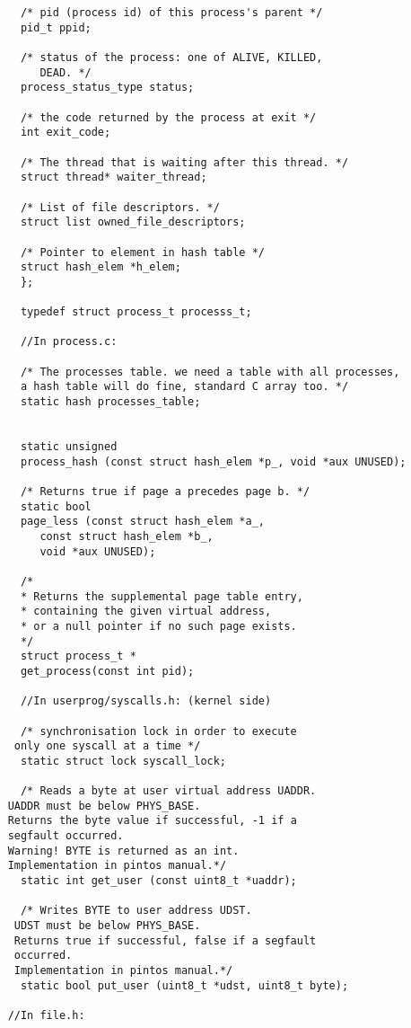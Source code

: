 {\begin{lstlisting}
	  /* pid (process id) of this process's parent */
	  pid_t ppid;				
	  
	  /* status of the process: one of ALIVE, KILLED, 
	     DEAD. */
	  process_status_type status;
      
	  /* the code returned by the process at exit */
	  int exit_code;

	  /* The thread that is waiting after this thread. */
	  struct thread* waiter_thread;

	  /* List of file descriptors. */
	  struct list owned_file_descriptors;

	  /* Pointer to element in hash table */
	  struct hash_elem *h_elem;
      };
    
      typedef struct process_t processs_t;

      //In process.c: 

      /* The processes table. we need a table with all processes, 
      a hash table will do fine, standard C array too. */
      static hash processes_table;

     
      static unsigned
      process_hash (const struct hash_elem *p_, void *aux UNUSED);
      
      /* Returns true if page a precedes page b. */
      static bool
      page_less (const struct hash_elem *a_, 
		 const struct hash_elem *b_,
		 void *aux UNUSED);	

      /*
      * Returns the supplemental page table entry, 
      * containing the given virtual address,
      * or a null pointer if no such page exists.
      */
      struct process_t *
      get_process(const int pid);

      //In userprog/syscalls.h: (kernel side)
      
      /* synchronisation lock in order to execute
	 only one syscall at a time */
      static struct lock syscall_lock;

      /* Reads a byte at user virtual address UADDR.
	UADDR must be below PHYS_BASE.
	Returns the byte value if successful, -1 if a 
	segfault occurred. 
	Warning! BYTE is returned as an int.
	Implementation in pintos manual.*/
      static int get_user (const uint8_t *uaddr);

      /* Writes BYTE to user address UDST.
	 UDST must be below PHYS_BASE.
	 Returns true if successful, false if a segfault 
	 occurred. 
	 Implementation in pintos manual.*/
      static bool put_user (uint8_t *udst, uint8_t byte);

    //In file.h:
    

\end{lstlisting}}
